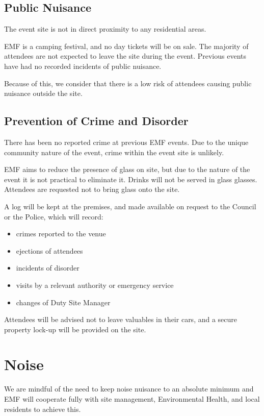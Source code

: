 \subsection{Public Nuisance}

The event site is not in direct proximity to any residential areas.

EMF is a camping festival, and no day tickets will be on sale. The majority of
attendees are not expected to leave the site during the event. Previous events
have had no recorded incidents of public nuisance.

Because of this, we consider that there is a low risk of attendees causing
public nuisance outside the site.

\subsection{Prevention of Crime and Disorder}

There has been no reported crime at previous EMF events. Due to the unique
community nature of the event, crime within the event site is unlikely.

EMF aims to reduce the presence of glass on site, but due to the nature of the
event it is not practical to eliminate it. Drinks will not be served in glass glasses.
Attendees are requested not to bring glass onto the site.

A log will be kept at the premises, and made available on request to the Council
or the Police, which will record:

\begin{itemize}
\tightlist
    \item crimes reported to the venue
    \item ejections of attendees
    \item incidents of disorder
    \item visits by a relevant authority or emergency service
    \item changes of Duty Site Manager
\end{itemize}

Attendees will be advised not to leave valuables in their cars, and a secure property
lock-up will be provided on the site.

\newpage

\section{Noise}
\label{noise}
We are mindful of the need to keep noise nuisance to an absolute minimum and
EMF will cooperate fully with site management, Environmental Health, and local
residents to achieve this.

